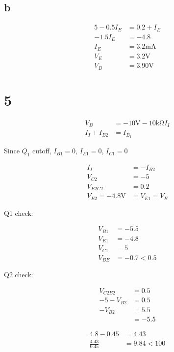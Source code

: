 \documentclass{article}
\begin{document}
\begin{multicols}{2}
    \subsection*{b}
    \begin{align*}
        5 -  0.5 I_E & = 0.2 + I_E               \\
        -1.5 I_E     & = -4.8                    \\
        I_E          & = 3.2 \si{\milli\ampere}  \\
        V_E          & = 3.2 \si{\volt}          \\
        V_B          & = \boxed{3.90 \si{\volt}}
    \end{align*}
\end{multicols}

\pagebreak
\section*{5}
\begin{align*}
    V_B          & = -10 \si{\volt} - 10 \si{\kilo\ohm} I_I \\
    I_I + I_{B2} & = I_{B_1}
\end{align*}

Since \(Q_1\) cutoff, \(I_{B1} = 0\), \(I_{E1} = 0\), \(I_{C1} = 0\)

\begin{align*}
    I_I                              & = -I_{B2}      \\
    V_{C2}                           & = -5           \\
    V_{E2C2}                         & = 0.2          \\
    V_{E2} = \boxed{-4.8 \si{\volt}} & = V_{E1} = V_E
\end{align*}

Q1 check:

\begin{align*}
    V_{B1} & = -5.5               \\
    V_{E1} & = -4.8               \\
    V_{C1} & =  5                 \\
    V_{BE} & = \boxed{-0.7 < 0.5}
\end{align*}

Q2 check:

\begin{align*}
    V_{C2B2}    & = 0.5  \\
    -5 - V_{B2} & = 0.5  \\
    -V_{B2}     & = 5.5  \\
                & = -5.5
\end{align*}

\begin{align*}
    4.8-0.45          & = 4.43               \\
    \frac{4.43}{0.45} & = \boxed{9.84 < 100}
\end{align*}
\end{document}
